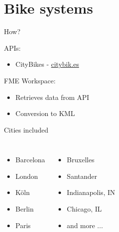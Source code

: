 \documentclass[10pt, compress]{beamer}
\begin{document}
\section{Bike systems}
\begin{frame}{How?}
    
    APIs:
    \begin{itemize}
        \item CityBikes - \url{citybik.es}
    \end{itemize}
    FME Workspace:
    \begin{itemize}
        \item Retrieves data from API
        \item Conversion to KML
    \end{itemize}
    
\end{frame}


\begin{frame}{Cities included}
    \begin{columns}[onlytextwidth]
        \begin{itemize}
            \item Barcelona
            \item London
            \item Köln
            \item Berlin
            \item Paris
        \end{itemize}
        \begin{itemize}
            \item Bruxelles
            \item Santander
            \item Indianapolis, IN
            \item Chicago, IL
            \item and more ...
        \end{itemize}
    \end{columns}
    
\end{frame}


{
\plain{}{}
}
\end{document}
